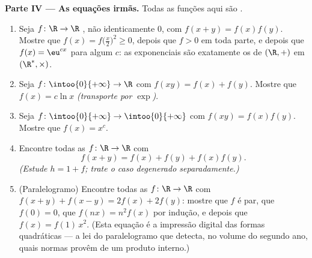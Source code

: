 \begin{problem}[{Problema de fim de semana --- $f(x + y) = f(x) + f(y)$:
a regularidade força a linearidade, e o retrato dos monstros}]
\medskip
\noindent\textbf{Parte IV --- As equações irmãs.} Todas as
funções aqui são .
\begin{enumerate}
  \item Seja $f \colon \R \to \R$ , não identicamente
        $0$, com $f(x + y) = f(x)f(y)$. Mostre que $f(x) =
        f\bigl(\frac x2\bigr)^2 \geq 0$, depois que $f > 0$ em toda parte,
        e depois que $f(x) = \eu^{cx}$ para algum $c$: as exponenciais
        são exatamente os   de $(\R, +)$ em
        $(\R^*, \times)$.
  \item Seja $f \colon \intoo{0}{+\infty} \to \R$ 
        com $f(xy) = f(x) + f(y)$. Mostre que $f(x) = c\ln x$
        \emph{(transporte por $\exp$)}.
  \item Seja $f \colon \intoo{0}{+\infty} \to \intoo{0}{+\infty}$
         com $f(xy) = f(x)f(y)$. Mostre que $f(x) = x^c$.
  \item Encontre todas as $f \colon \R \to \R$  com
        \[
        f(x + y) = f(x) + f(y) + f(x)f(y) .
        \]
        \emph{(Estude $h = 1 + f$; trate o caso degenerado
        separadamente.)}
  \item (Paralelogramo) Encontre todas as $f \colon \R \to \R$
         com $f(x + y) + f(x - y) = 2f(x) + 2f(y)$: mostre que $f$ é
        par, que $f(0) = 0$, que $f(nx) = n^2 f(x)$ por indução, e depois que
        $f(x) = f(1)\,x^2$. (Esta equação é a impressão digital das
        formas quadráticas --- a lei do paralelogramo que detecta,
        no volume do segundo ano, quais normas provêm de um produto
        interno.)
\end{enumerate}


\end{problem}
